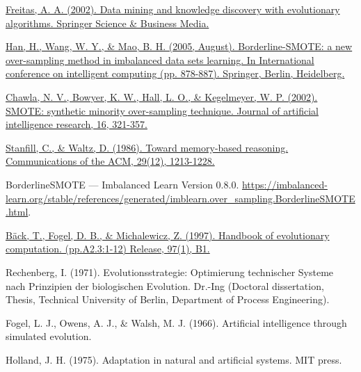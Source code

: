 \begin{thebibliography}{9}
	\href{https://link.springer.com/book/10.1007/978-3-662-04923-5}{Freitas, A. A. (2002). Data mining and knowledge discovery with evolutionary algorithms. Springer Science \& Business Media.}


	\href{https://link.springer.com/chapter/10.1007/11538059_91}{Han, H., Wang, W. Y., \& Mao, B. H. (2005, August). Borderline-SMOTE: a new over-sampling method in imbalanced data sets learning. In International conference on intelligent computing (pp. 878-887). Springer, Berlin, Heidelberg.}


	\href{https://www.jair.org/index.php/jair/article/view/10302}{Chawla, N. V., Bowyer, K. W., Hall, L. O., \& Kegelmeyer, W. P. (2002). SMOTE: synthetic minority over-sampling technique. Journal of artificial intelligence research, 16, 321-357.}


	\href{https://dl.acm.org/doi/pdf/10.1145/7902.7906}{Stanfill, C., \& Waltz, D. (1986). Toward memory-based reasoning. Communications of the ACM, 29(12), 1213-1228.}


	BorderlineSMOTE — Imbalanced Learn Version 0.8.0. \url{https://imbalanced-learn.org/stable/references/generated/imblearn.over_sampling.BorderlineSMOTE.html}.



	\href{https://www.researchgate.net/publication/216300863_A_history_of_evolutionary_computation}{Bäck, T., Fogel, D. B., \& Michalewicz, Z. (1997). Handbook of evolutionary computation. (pp.A2.3:1-12) Release, 97(1), B1.}


	Rechenberg, I. (1971). Evolutionsstrategie: Optimierung technischer Systeme nach Prinzipien der biologischen Evolution. Dr.-Ing (Doctoral dissertation, Thesis, Technical University of Berlin, Department of Process Engineering).


	Fogel, L. J., Owens, A. J., \& Walsh, M. J. (1966). Artificial intelligence through simulated evolution.


	Holland, J. H. (1975). Adaptation in natural and artificial systems. MIT press.


\end{thebibliography}
